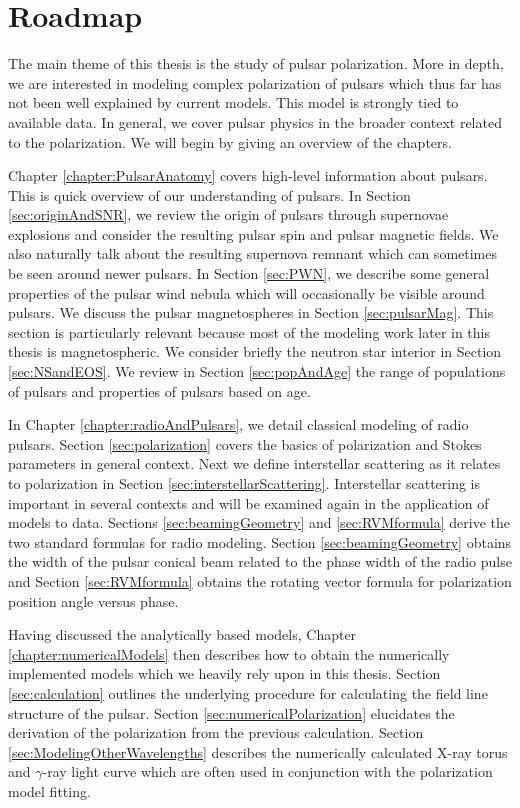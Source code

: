 \chapter{Roadmap}


The main theme of this thesis is the study of 
pulsar polarization.  More in depth, we are interested
in modeling complex polarization of pulsars which
thus far has not been well explained by current models.
This model is strongly tied to available data.
In general, we cover pulsar physics in the
broader context related to the polarization.
We will begin by giving an overview of the 
chapters.

Chapter \ref{chapter:PulsarAnatomy} covers 
high-level information about pulsars.  This is 
quick overview of our understanding of pulsars.
In Section \ref{sec:originAndSNR},
we review the origin of pulsars through supernovae 
explosions and consider the resulting pulsar spin
and pulsar magnetic fields.  We also naturally talk about
the resulting supernova remnant which can 
sometimes be seen around newer pulsars.
In Section \ref{sec:PWN}, we describe some
general properties of the pulsar wind nebula
which will occasionally be visible around pulsars.
We discuss the pulsar magnetospheres in 
Section \ref{sec:pulsarMag}.  This section is particularly
relevant because most of the modeling work later in this
thesis is magnetospheric.
We consider briefly
the neutron star interior in Section \ref{sec:NSandEOS}.
We review in Section \ref{sec:popAndAge}
the range of populations of pulsars and properties of pulsars
based on age.

In Chapter \ref{chapter:radioAndPulsars}, we detail
classical modeling of radio pulsars.  Section
\ref{sec:polarization} covers the basics of polarization
and Stokes parameters in general context.
Next we define interstellar scattering as it relates 
to polarization in Section \ref{sec:interstellarScattering}.  
Interstellar scattering is important in 
several contexts and will be examined again
in the application of models to data.
Sections \ref{sec:beamingGeometry} and \ref{sec:RVMformula}
derive the two standard formulas for radio modeling.
Section \ref{sec:beamingGeometry} obtains
the width of the pulsar conical beam related to the 
phase width of the radio pulse and 
Section \ref{sec:RVMformula} obtains the 
rotating vector formula for polarization position
angle versus phase.


Having discussed the analytically based models,
Chapter \ref{chapter:numericalModels} then describes
how to obtain the numerically implemented models
which we heavily rely upon in this thesis.
Section \ref{sec:calculation} outlines the 
underlying procedure
for calculating the field line structure
of the pulsar.  Section \ref{sec:numericalPolarization} 
elucidates the derivation of the polarization 
from the previous calculation.
Section \ref{sec:ModelingOtherWavelengths} 
describes the numerically
calculated X-ray torus and $\gamma$-ray light
curve which are often used in conjunction
with the polarization model fitting.


